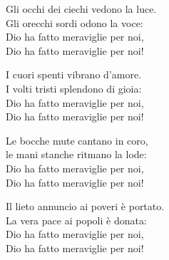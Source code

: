 

\spazio

\strofa Gli occhi dei ciechi vedono la luce.\\
Gli orecchi sordi odono la voce:\\
Dio ha fatto meraviglie per noi,\\
Dio ha fatto meraviglie per noi!

\spazio


\spazio

\strofa I cuori spenti vibrano d'amore.\\
I volti tristi splendono di gioia:\\
Dio ha fatto meraviglie per noi,\\
Dio ha fatto meraviglie per noi!

\spazio


\spazio

\strofa Le bocche mute cantano in coro,\\
le mani stanche ritmano la lode:\\
Dio ha fatto meraviglie per noi,\\
Dio ha fatto meraviglie per noi!

\spazio


\spazio

\strofa Il lieto annuncio ai poveri è portato.\\
La vera pace ai popoli è donata:\\
Dio ha fatto meraviglie per noi,\\
Dio ha fatto meraviglie per noi!

\spazio

